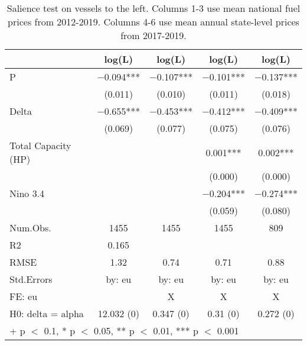 \begin{table}

\caption{\label{tab:}Salience test on vessels to the left.
             Columns 1-3 use mean national fuel prices from 2012-2019.
             Columns 4-6 use mean annual state-level prices from 2017-2019.}
\centering
\begin{tabular}[t]{lcccc}
\toprule
  & log(L) & log(L)  & log(L)   & log(L)   \\
\midrule
P & \num{-0.094}*** & \num{-0.107}*** & \num{-0.101}*** & \num{-0.137}***\\
 & (\num{0.011}) & (\num{0.010}) & (\num{0.011}) & (\num{0.018})\\
Delta & \num{-0.655}*** & \num{-0.453}*** & \num{-0.412}*** & \num{-0.409}***\\
 & (\num{0.069}) & (\num{0.077}) & (\num{0.075}) & (\num{0.076})\\
Total Capacity (HP) &  &  & \num{0.001}*** & \num{0.002}***\\
 &  &  & (\num{0.000}) & (\num{0.000})\\
Nino 3.4 &  &  & \num{-0.204}*** & \num{-0.274}***\\
 &  &  & (\num{0.059}) & (\num{0.080})\\
\midrule
Num.Obs. & \num{1455} & \num{1455} & \num{1455} & \num{809}\\
R2 & \num{0.165} &  &  & \\
RMSE & \num{1.32} & \num{0.74} & \num{0.71} & \num{0.88}\\
Std.Errors & by: eu & by: eu & by: eu & by: eu\\
FE: eu &  & X & X & X\\
H0: delta = alpha & 12.032 (0) & 0.347 (0) & 0.31 (0) & 0.272 (0)\\
\bottomrule
\multicolumn{5}{l}{\rule{0pt}{1em}+ p $<$ 0.1, * p $<$ 0.05, ** p $<$ 0.01, *** p $<$ 0.001}\\
\end{tabular}
\end{table}
